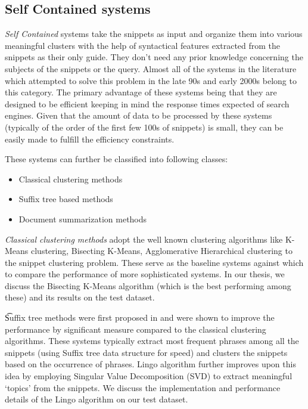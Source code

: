 \documentclass[a4paper,12pt]{report}
\begin{document}
\subsection{Self Contained systems}

{\it Self Contained} systems take the snippets as input and organize
them into various meaningful clusters with the help of syntactical
features extracted from the snippets as their only guide. They don't
need any prior knowledge concerning the subjects of the snippets or
the query. Almost all of the systems in the literature which attempted
to solve this problem in the late 90s and early 2000s belong to this
category. The primary advantage of these systems being that they are
designed to be efficient keeping in mind the response times expected
of search engines. Given that the amount of data to be processed by
these systems (typically of the order of the first few 100s of
snippets) is small, they can be easily made to fulfill the efficiency
constraints. 

These systems can further be classified into following classes:
\begin{itemize}
  \item Classical clustering methods 
  \item Suffix tree based methods
  \item Document summarization methods
\end{itemize}

{\it Classical clustering methods} adopt the well known clustering
algorithms like K-Means clustering, Bisecting K-Means, Agglomerative
Hierarchical clustering to the snippet clustering problem. These serve
as the baseline systems against which to compare the performance of
more sophisticated systems. In our thesis, we discuss the Bisecting
K-Means algorithm (which is the best performing among these)
\cite{clusteringCompare} and its results on the test dataset.

{\t Suffix tree methods} were first proposed in \cite{Zamir} and were
shown to improve the performance by significant measure compared to
the classical clustering algorithms. These systems typically extract
most frequent phrases among all the snippets (using Suffix tree
data structure for speed) and clusters the snippets based on the
occurrence of phrases. Lingo algorithm further improves upon this idea
by employing Singular Value Decomposition (SVD) to extract meaningful
`topics' from the snippets.\cite{Weiss} We discuss the implementation
and performance details of the Lingo algorithm on our test dataset.
\end{document}
